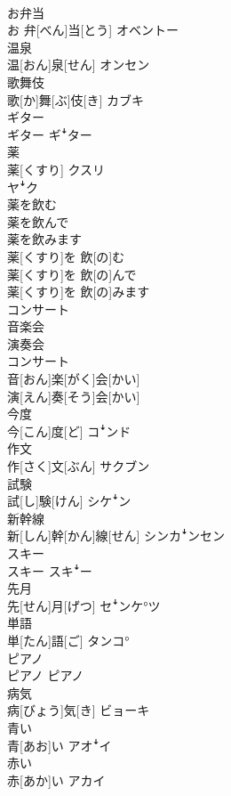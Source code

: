\documentclass[8pt]{extreport}
\begin{document}
\begin{CJK}{UTF8}{min}
\\	お弁当	
\\	お 弁[べん]当[とう]	オベントー
\\	温泉	
\\	温[おん]泉[せん]	オンセン
\\	歌舞伎	
\\	歌[か]舞[ぶ]伎[き]	カブキ
\\	ギター	
\\	ギター	ギꜜター
\\	薬	
\\	薬[くすり]	クスリ 
\\	ヤꜜク
\\	薬を飲む 
\\	薬を飲んで 
\\	薬を飲みます	
\\	薬[くすり]を 飲[の]む 
\\	薬[くすり]を 飲[の]んで 
\\	薬[くすり]を 飲[の]みます	
\\	コンサート 
\\	音楽会 
\\	演奏会	
\\	コンサート 
\\	音[おん]楽[がく]会[かい] 
\\	演[えん]奏[そう]会[かい]	
\\	今度	
\\	今[こん]度[ど]	コꜜンド
\\	作文	
\\	作[さく]文[ぶん]	サクブン
\\	試験	
\\	試[し]験[けん]	シケꜜン
\\	新幹線	
\\	新[しん]幹[かん]線[せん]	シンカꜜンセン
\\	スキー	
\\	スキー	スキꜜー
\\	先月	
\\	先[せん]月[げつ]	セꜜンケ°ツ
\\	単語	
\\	単[たん]語[ご]	タンコ°
\\	ピアノ	
\\	ピアノ	ピアノ
\\	病気	
\\	病[びょう]気[き]	ビョーキ
\\	青い	
\\	青[あお]い	アオꜜイ
\\	赤い	
\\	赤[あか]い	アカイ

\end{CJK}
\end{document}
